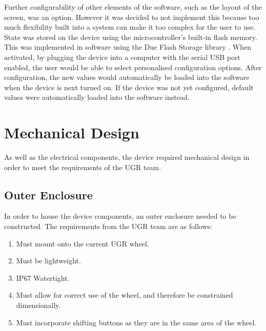 \documentclass[a4paper,12pt]{article}
\begin{document}
Further configurability of other elements of the software, such as the layout of the screen, was an option. However it was decided to not implement this because too much flexibility built into a system can make it too complex for the user to use. \\



State was stored on the device using the microcontroller's built-in flash memory. This was implemented in software using the Due Flash Storage library \cite{due_flash_storage}. When activated, by plugging the device into a computer with the serial USB port enabled, the user would be able to select personalised configuration options. After configuration, the new values would automatically be loaded into the software when the device is next turned on. If the device was not yet configured, default values were automatically loaded into the software instead.


\newpage
\section{Mechanical Design}
\label{sec:mechanical_design}

As well as the electrical components, the device required mechanical design in order to meet the requirements of the UGR team.

\subsection{Outer Enclosure}
\label{sec:outer_enclosure}

In order to house the device components, an outer enclosure needed to be constructed. The requirements from the UGR team are as follows:

\begin{enumerate}
  \item Must mount onto the current UGR wheel.
  \item Must be lightweight.
  \item IP67 Watertight.
  \item Must allow for correct use of the wheel, and therefore be constrained dimensionally.
  \item Must incorporate shifting buttons as they are in the same area of the wheel.
\end{enumerate}
\end{document}
